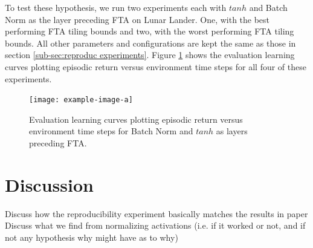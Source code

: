 \documentclass{article}
\begin{document}
To test these hypothesis, we run two experiments each with $tanh$ and Batch Norm as the layer preceding FTA on Lunar Lander. 
One, with the best performing FTA tiling bounds and two, with the worst performing FTA tiling bounds. 
All other parameters and configurations are kept the same as those in section \ref{sub-sec:reproduc experiments}. 
Figure \ref{fig:bnvtanh} shows the evaluation learning curves plotting episodic return versus environment time steps for all four of these experiments.

\begin{figure}[h]
    \centering
    \texttt{[image: example-image-a]}
    \caption{Evaluation learning curves plotting episodic return versus environment time steps for Batch Norm and $tanh$ as layers preceding FTA.}
    \label{fig:bnvtanh}
\end{figure}


\section{Discussion} \label{sec:discussion}
Discuss how the reproducibility experiment basically matches the results in \cite[]{pan2019fuzzy} paper
Discuss what we find from normalizing activations (i.e. if it worked or not, and if not any hypothesis why might have as to why)


\newpage

\end{document}
